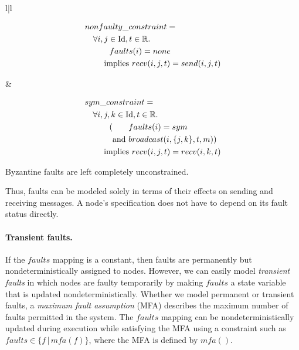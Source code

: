 \documentclass{llncs/llncs}
\newcommand{\Id}{\ensuremath{\mathrm{Id}}\xspace}
\begin{document}
\begin{center}
\begin{tabular}{l|l}
\begin{minipage}[t]{0.5\linewidth}
\[\begin{aligned}
&nonfaulty\_constraint =\\
  &\quad \forall i, j \in \Id, t \in \mathbb{R}.\\
  &\quad\quad\quad faults(i) = none\\
  &\quad\quad \textnormal{ implies } recv(i, j, t) = send(i, j, t)
\end{aligned}\]
\end{minipage}&
\begin{minipage}[t]{0.5\linewidth}
\[\begin{aligned}
&sym\_constraint =\\
  &\quad \forall i, j, k \in \Id, t \in \mathbb{R}.\\
  &\quad\quad\quad (\phantom{\textnormal{and }} faults(i) = sym\\
  &\quad\quad\quad \phantom{(}\textnormal{and } broadcast(i, \{j, k\}, t, m))\\
  &\quad\quad \textnormal{ implies } recv(i, j, t) = recv(i, k, t)
\end{aligned}\]
\end{minipage}
\end{tabular}
\end{center}

\noindent
Byzantine faults are left completely unconstrained.

Thus, faults can be modeled solely in terms of their effects on sending and receiving messages. A node's specification does not have to depend on its fault status directly.

\paragraph{Transient faults.} If the $faults$ mapping is a constant, then faults are permanently but nondeterministically assigned to nodes. However, we can easily model \emph{transient faults} in which nodes are faulty temporarily by making $faults$ a state variable that is updated nondeterministically. Whether we model permanent or transient faults, a \emph{maximum fault assumption} (MFA) describes the maximum number of faults permitted in the system. The $faults$ mapping can be nondeterministically updated during execution while satisfying the MFA using a constraint such as $faults \in \{f \, | \, mfa(f) \}$, where the MFA is defined by $mfa()$.
\end{document}
